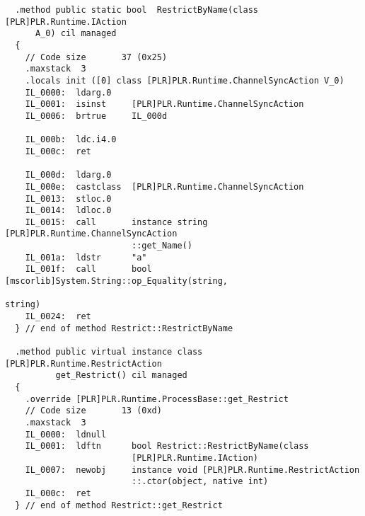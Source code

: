 \begin{lstlisting}
  .method public static bool  RestrictByName(class [PLR]PLR.Runtime.IAction 
      A_0) cil managed
  {
    // Code size       37 (0x25)
    .maxstack  3
    .locals init ([0] class [PLR]PLR.Runtime.ChannelSyncAction V_0)
    IL_0000:  ldarg.0
    IL_0001:  isinst     [PLR]PLR.Runtime.ChannelSyncAction
    IL_0006:  brtrue     IL_000d

    IL_000b:  ldc.i4.0
    IL_000c:  ret

    IL_000d:  ldarg.0
    IL_000e:  castclass  [PLR]PLR.Runtime.ChannelSyncAction
    IL_0013:  stloc.0
    IL_0014:  ldloc.0
    IL_0015:  call       instance string [PLR]PLR.Runtime.ChannelSyncAction
                         ::get_Name()
    IL_001a:  ldstr      "a"
    IL_001f:  call       bool [mscorlib]System.String::op_Equality(string,
                                                                   string)
    IL_0024:  ret
  } // end of method Restrict::RestrictByName

  .method public virtual instance class [PLR]PLR.Runtime.RestrictAction 
          get_Restrict() cil managed
  {
    .override [PLR]PLR.Runtime.ProcessBase::get_Restrict
    // Code size       13 (0xd)
    .maxstack  3
    IL_0000:  ldnull
    IL_0001:  ldftn      bool Restrict::RestrictByName(class 
                         [PLR]PLR.Runtime.IAction)
    IL_0007:  newobj     instance void [PLR]PLR.Runtime.RestrictAction
                         ::.ctor(object, native int)
    IL_000c:  ret
  } // end of method Restrict::get_Restrict


\end{lstlisting}
